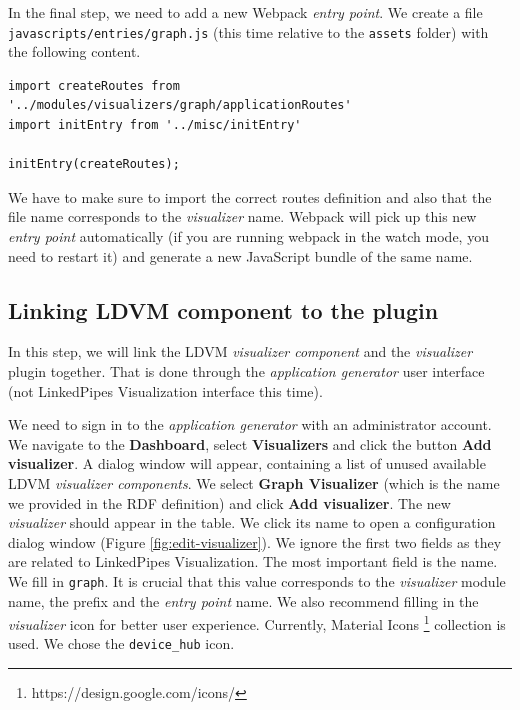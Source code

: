 In the final step, we need to add a new Webpack \emph{entry point}. We create a file \texttt{javascripts/entries/graph.js} (this time relative to the \texttt{assets} folder) with the following content. 

\begin{verbatim}
import createRoutes from '../modules/visualizers/graph/applicationRoutes'
import initEntry from '../misc/initEntry'

initEntry(createRoutes);
\end{verbatim}

We have to make sure to import the correct routes definition and also that the file name corresponds to the \emph{visualizer} name. Webpack will pick up this new \emph{entry point} automatically (if you are running webpack in the watch mode, you need to restart it) and generate a new JavaScript bundle of the same name.


\subsection{Linking LDVM component to the plugin}

In this step, we will link the LDVM \emph{visualizer component} and the \emph{visualizer} plugin together. That is done through the \emph{application generator} user interface (not LinkedPipes Visualization interface this time).

We need to sign in to the \emph{application generator} with an administrator account. We navigate to the \textbf{Dashboard}, select \textbf{Visualizers} and click the button \textbf{Add visualizer}. A dialog window will appear, containing a list of unused available LDVM \emph{visualizer components}. We select \textbf{Graph Visualizer} (which is the name we provided in the RDF definition)  and click \textbf{Add visualizer}. The new \emph{visualizer} should appear in the table. We click its name to open a configuration dialog window (Figure \ref{fig:edit-visualizer}). We ignore the first two fields as they are related to LinkedPipes Visualization. The most important field is the name. We fill in \texttt{graph}. It is crucial that this value corresponds to the \emph{visualizer} module name, the prefix and the \emph{entry point} name. We also recommend filling in the \emph{visualizer} icon for better user experience. Currently, Material Icons \footnote{https://design.google.com/icons/} collection is used. We chose the \texttt{device\_hub} icon.

